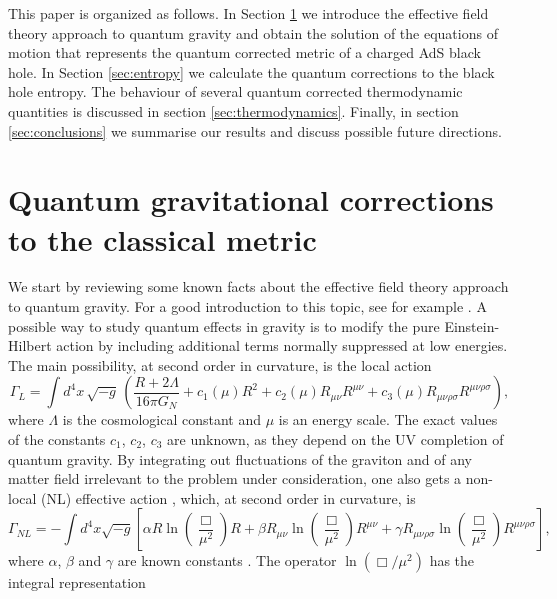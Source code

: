 \documentclass[10pt,a4paper]{article}
\begin{document}
This paper is organized as follows. In Section \ref{sec:corrections_metric} we introduce the effective field theory approach to quantum gravity and obtain the solution of the equations of motion that represents the quantum corrected metric of a charged AdS black hole. In Section \ref{sec:entropy} we calculate the quantum corrections to the black hole entropy. The behaviour of several quantum corrected thermodynamic quantities is discussed in section \ref{sec:thermodynamics}. Finally, in section \ref{sec:conclusions} we summarise our results and discuss possible future directions. 
\section{Quantum gravitational corrections to the classical metric}\label{sec:corrections_metric}
We start by reviewing some known facts about the effective field theory approach to quantum gravity. For a good introduction to this topic, see for example \cite{Donoghue:2017pgk}. A possible way to study quantum effects in gravity is to modify the pure Einstein-Hilbert action by including additional terms normally suppressed at low energies. The main possibility, at second order in curvature, is the local action
\begin{equation}\label{eq:local_action}
    \Gamma_{L}=\int d^4x\, \sqrt{-g}\,\left(\frac{R+2\Lambda}{16\pi G_N} +c_1(\mu)R^2+c_2(\mu)R_{\mu\nu}R^{\mu\nu}+c_3(\mu)R_{\mu\nu\rho\sigma}R^{\mu\nu\rho\sigma}\right),
\end{equation}
where $\Lambda$ is the cosmological constant and $\mu$ is an energy scale. The exact values of the constants $c_1$, $c_2$, $c_3$ are unknown, as they depend on the UV completion of quantum gravity.
By integrating out fluctuations of the graviton and of any matter field irrelevant to the problem under consideration, one also gets a non-local (NL) effective action \cite{Weinberg:1980gg, Starobinky:1981, Barvinsky:1983vpp, Barvinsky:1985an, Barvinsky:1987uw, Barvinsky:1990up, Donoghue:1994dn}, which, at second order in curvature, is
\begin{equation}
    \Gamma_{NL}=-\int d^4 x \sqrt{-g}\left[\alpha R\ln\left(\frac{\Box}{\mu^2}\right)R+\beta R_{\mu\nu}\ln\left(\frac{\Box}{\mu^2}\right)R^{\mu\nu} + \gamma R_{\mu\nu\rho\sigma}\ln\left(\frac{\Box}{\mu^2}\right)R^{\mu\nu\rho\sigma}\right],
\end{equation}
where $\alpha$, $\beta$ and $\gamma$ are known constants \cite{Donoghue:2014yha}.
The operator $\ln\left(\Box/\mu^2\right)$ has the integral representation \cite{Donoghue:2015nba}
\end{document}
